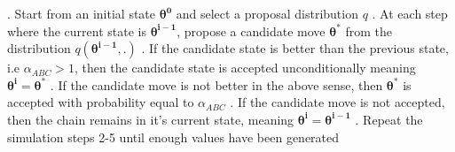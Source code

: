 \begin{algorithm}[H]
	\caption{ }
	\begin{algorithmic}
		. Start from an initial state $\bm{\theta^0}$ and select a proposal distribution $q$
		. At each step where the current state is $\bm{\theta^{i-1}}$, propose a candidate 	move $\bm{\theta^*}$ from the distribution $q(\bm{\theta^{i-1}},.)$		
		. If the candidate state is better than the previous state, i.e $\alpha_{ABC} > 1$, then the candidate state is accepted unconditionally meaning $\bm{\theta^i} = \bm{\theta^*}$
		. If the candidate move is not better in the above sense, then $\bm{\theta^*}$ is accepted with probability equal to $\alpha_{ABC}$		
		. If the candidate move is not accepted, then the chain remains in it's current state, meaning $\bm{\theta^{i}} = \bm{\theta^{i-1}}$		
		. Repeat the simulation steps 2-5 until enough values have been generated
	\end{algorithmic}
	\label{ABC-MCMC}
\end{algorithm}